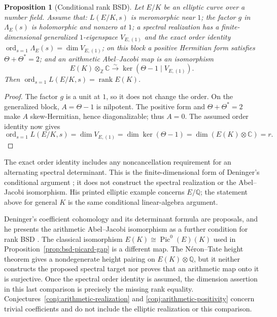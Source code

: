 \documentclass[11pt]{amsart}
\theoremstyle{plain}
\newtheorem{proposition}[theorem]{Proposition}
\theoremstyle{definition}
\theoremstyle{remark}
\numberwithin{equation}{section}
\newcommand{\C}{\mathbb{C}}
\newcommand{\Q}{\mathbb{Q}}
\newcommand{\Z}{\mathbb{Z}}
\DeclareMathOperator{\ord}{ord}
\begin{document}
\begin{proposition}[Conditional rank BSD]\label{prop:bsd-spectral-rank}
Let $E/K$ be an elliptic curve over a number field. Assume that:
$L(E/K,s)$ is meromorphic near $1$; the factor $g$ in
$\Lambda_E(s)$ is holomorphic and nonzero at $1$;
a spectral realization has a finite-dimensional generalized
$1$-eigenspace $V_{E,(1)}$ and the exact order identity
$\ord_{s=1}\Lambda_E(s)=\dim V_{E,(1)}$;
on this block a positive Hermitian form satisfies
$\Theta+\Theta^*=2$; and an arithmetic Abel--Jacobi map is an
isomorphism
\[
  E(K)\otimes_\Z\C\xrightarrow{\sim}
  \ker(\Theta-1\mid V_{E,(1)}).
\]
Then $\ord_{s=1}L(E/K,s)=\operatorname{rank}E(K)$.
\end{proposition}
\begin{proof}
The factor $g$ is a unit at $1$, so it does not change the order.
On the generalized block, $A=\Theta-1$ is nilpotent. The positive
form and $\Theta+\Theta^*=2$ make $A$ skew-Hermitian, hence
diagonalizable; thus $A=0$. The assumed order identity now gives
\[
  \ord_{s=1}L(E/K,s)=\dim V_{E,(1)}
  =\dim\ker(\Theta-1)=\dim(E(K)\otimes\C)=r.
\]
\end{proof}

The exact order identity includes any noncancellation requirement for
an alternating spectral determinant. This is the finite-dimensional
form of Deninger's conditional argument
\cite[p.~8 and Example~5, p.~10]{Deninger2010HilbertPolya}; it does not
construct the spectral realization or the Abel--Jacobi isomorphism.
His printed elliptic example concerns $E/\Q$; the statement above
for general $K$ is the same conditional linear-algebra argument.

Deninger's coefficient cohomology and its determinant formula are
proposals, and he presents the arithmetic Abel--Jacobi isomorphism
as a further condition for rank BSD
\cite[pp.~6--8 and Example~5, p.~10]{Deninger2010HilbertPolya}.
The classical isomorphism $E(K)\cong\operatorname{Pic}^0(E)(K)$ used
in Proposition~\ref{prop:bsd-picard-gap} is a different map.
The N\'eron--Tate height theorem gives a nondegenerate height pairing
on $E(K)\otimes\Q$, but it neither constructs the proposed spectral
target nor proves that an arithmetic map onto it is surjective.
Once the spectral order identity is assumed, the dimension assertion
in this last comparison is precisely the missing rank equality.
Conjectures~\ref{conj:arithmetic-realization} and
\ref{conj:arithmetic-positivity} concern trivial coefficients and
do not include the elliptic realization or this comparison.
\end{document}
